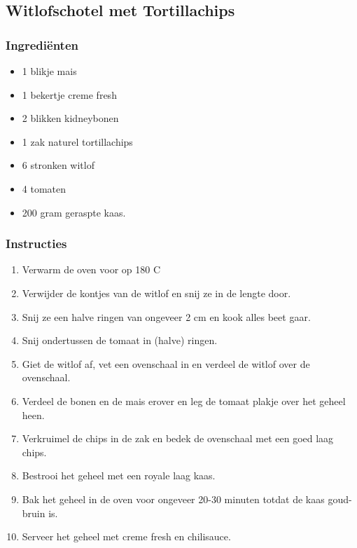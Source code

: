 \subsection{Witlofschotel met Tortillachips}
\subsubsection*{Ingrediënten}
\begin{multicols}{2}
    \begin{itemize}
        \item 1 blikje mais
        \item 1 bekertje creme fresh
        \item 2 blikken kidneybonen
        \item 1 zak naturel tortillachips
        \item 6 stronken witlof
        \item 4 tomaten
        \item 200 gram geraspte kaas.
    \end{itemize}
\end{multicols}

\subsubsection*{Instructies}
\begin{multicols}{2}
    \begin{enumerate}
        \item Verwarm de oven voor op 180 C
        \item Verwijder de kontjes van de witlof en snij ze in de lengte door.
        \item Snij ze een halve ringen van ongeveer 2 cm en kook alles beet gaar.
        \item Snij ondertussen de tomaat in (halve) ringen.
        \item Giet de witlof af, vet een ovenschaal in en verdeel de witlof over de ovenschaal.
        \item Verdeel de bonen en de mais erover en leg de tomaat plakje over het geheel heen.
        \item Verkruimel de chips in de zak en bedek de ovenschaal met een goed laag chips.
        \item Bestrooi het geheel met een royale laag kaas.
        \item Bak het geheel in de oven voor ongeveer 20-30 minuten totdat de kaas goud-bruin is.
        \item Serveer het geheel met creme fresh en chilisauce.
    \end{enumerate}
\end{multicols}